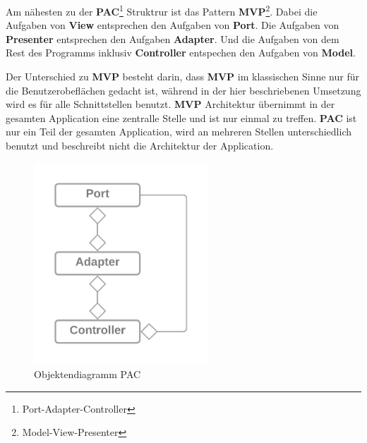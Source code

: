 Am nähesten zu der \textbf{PAC}\footnote{Port-Adapter-Controller} Struktrur 
ist das Pattern \textbf{MVP}\footnote{Model-View-Presenter}.
Dabei die Aufgaben von \textbf{View} entsprechen den Aufgaben von \textbf{Port}. 
Die Aufgaben von \textbf{Presenter} entsprechen den Aufgaben \textbf{Adapter}.
Und die Aufgaben von dem Rest des Programms inklusiv \textbf{Controller} entspechen den Aufgaben von \textbf{Model}.

Der Unterschied zu \textbf{MVP} besteht darin, dass \textbf{MVP} im klassischen Sinne nur für die Benutzerobeflächen gedacht ist,
während in der hier beschriebenen Umsetzung wird es für alle Schnittstellen benutzt.
\textbf{MVP} Architektur übernimmt in der gesamten Application eine zentralle Stelle und ist nur einmal zu treffen.
\textbf{PAC} ist nur ein Teil der gesamten Application, wird an mehreren Stellen unterschiedlich benutzt und beschreibt nicht 
die Architektur der Application.


\begin{figure}[H]
   \centering
   \includegraphics[width=6.5cm]{./images/Port-Adapter-Contoller.png}
    \caption[Objektendiagramm PAC]{Objektendiagramm PAC \footnotemark}
    \label{fig:CDPAC}
\end{figure}

